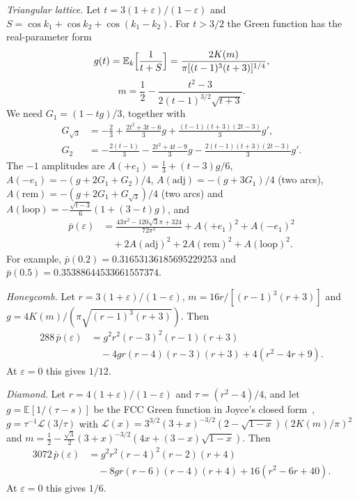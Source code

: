 \documentclass[aps,pra,10pt,twocolumn,superscriptaddress,nofootinbib]{revtex4-2}
\newcommand{\E}{\mathbb{E}}
\newcommand{\pbar}{\bar{p}}
\newcommand{\sq}{\sqrt{3}}
\begin{document}
\emph{Triangular lattice.} Let $t=3(1+\varepsilon)/(1-\varepsilon)$ and $S=\cos k_1+\cos k_2+\cos(k_1-k_2)$.
For $t>3/2$ the Green function has the real-parameter form
\begin{equation}
g(t)=\E_k\Bigl[\frac1{t+S}\Bigr]=\frac{2K(m)}{\pi[(t-1)^3(t+3)]^{1/4}},
\end{equation}
\begin{equation}
m=\frac12-\frac{t^2-3}{2(t-1)^{3/2}\sqrt{t+3}}.
\label{eq:tri-real}
\end{equation}
We need $G_1=(1-tg)/3$, together with
\begin{align}
G_{\sq}&=-\tfrac23+\tfrac{2t^2+3t-6}{3}g+\tfrac{(t-1)(t+3)(2t-3)}{3}g',\\
G_2&=-\tfrac{2(t-1)}3-\tfrac{2t^2+4t-9}{3}g-\tfrac{2(t-1)(t+3)(2t-3)}{3}g'.
\end{align}
The $-1$ amplitudes are
$A(+e_1)=\tfrac13+(t-3)g/6$,
$A(-e_1)=-(g+2G_1+G_2)/4$,
$A(\text{adj})=-(g+3G_1)/4$ (two arcs),
$A(\text{rem})=-(g+2G_1+G_{\sq})/4$ (two arcs) and
$A(\text{loop})=-\tfrac{\sqrt{t-3}}6(1+(3-t)g)$, and
\begin{align}
\pbar(\varepsilon)&=\frac{43\pi^2-120\sq\pi+324}{72\pi^2}+A(+e_1)^2+A(-e_1)^2\nonumber\\
&\quad+2A(\text{adj})^2+2A(\text{rem})^2+A(\text{loop})^2 .
\end{align}
For example, $\pbar(0.2)=0.31653136185695229253$ and $\pbar(0.5)=0.35388644533661557374$.

\emph{Honeycomb.} Let $r=3(1+\varepsilon)/(1-\varepsilon)$, $m=16r/[(r-1)^3(r+3)]$ and
$g=4K(m)/(\pi\sqrt{(r-1)^3(r+3)})$. Then
\begin{align}
288\,\pbar(\varepsilon)&=g^2r^2(r-3)^2(r-1)(r+3)\nonumber\\
&\quad-4gr(r-4)(r-3)(r+3)+4(r^2-4r+9).
\end{align}
At $\varepsilon=0$ this gives $1/12$.

\emph{Diamond.} Let $r=4(1+\varepsilon)/(1-\varepsilon)$ and $\tau=(r^2-4)/4$, and let $g=\E[1/(\tau-s)]$ be the FCC Green
function in Joyce's closed form~\cite{Joyce1994,Joyce1998},
$g=\tau^{-1}\mathcal L(3/\tau)$ with
$\mathcal L(x)=3^{3/2}(3+x)^{-3/2}(2-\sqrt{1-x})(2K(m)/\pi)^2$ and
$m=\tfrac12-\tfrac{\sq}{2}(3+x)^{-3/2}(4x+(3-x)\sqrt{1-x})$. Then
\begin{align}
3072\,\pbar(\varepsilon)&=g^2r^2(r-4)^2(r-2)(r+4)\nonumber\\
&\quad-8gr(r-6)(r-4)(r+4)+16(r^2-6r+40).
\end{align}
At $\varepsilon=0$ this gives $1/6$.
\end{document}
